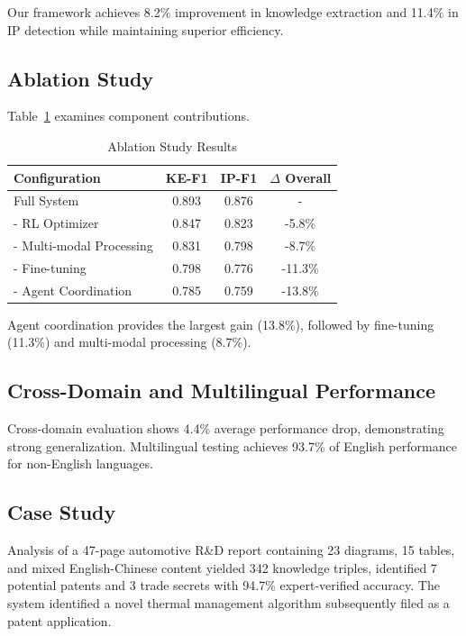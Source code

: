 \documentclass[11pt,a4paper]{article}
\begin{document}
Our framework achieves 8.2\% improvement in knowledge extraction and 11.4\% in IP detection while maintaining superior efficiency.

\subsection{Ablation Study}

Table~\ref{tab:ablation} examines component contributions.

\begin{table}[htbp]
\centering
\caption{Ablation Study Results}
\label{tab:ablation}
\begin{tabular}{lccc}
\toprule
\textbf{Configuration} & \textbf{KE-F1} & \textbf{IP-F1} & \textbf{$\Delta$ Overall} \\
\midrule
Full System & 0.893 & 0.876 & - \\
- RL Optimizer & 0.847 & 0.823 & -5.8\% \\
- Multi-modal Processing & 0.831 & 0.798 & -8.7\% \\
- Fine-tuning & 0.798 & 0.776 & -11.3\% \\
- Agent Coordination & 0.785 & 0.759 & -13.8\% \\
\bottomrule
\end{tabular}
\end{table}

Agent coordination provides the largest gain (13.8\%), followed by fine-tuning (11.3\%) and multi-modal processing (8.7\%).

\subsection{Cross-Domain and Multilingual Performance}

Cross-domain evaluation shows 4.4\% average performance drop, demonstrating strong generalization. Multilingual testing achieves 93.7\% of English performance for non-English languages.

\subsection{Case Study}

Analysis of a 47-page automotive R\&D report containing 23 diagrams, 15 tables, and mixed English-Chinese content yielded 342 knowledge triples, identified 7 potential patents and 3 trade secrets with 94.7\% expert-verified accuracy. The system identified a novel thermal management algorithm subsequently filed as a patent application.
\end{document}
